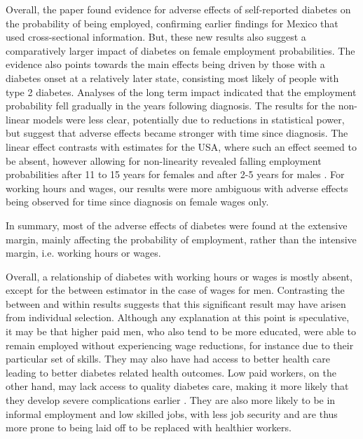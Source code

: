 \documentclass[10pt,letterpaper]{article}
\begin{document}
Overall, the paper found evidence for adverse effects of self-reported diabetes on the probability of being employed, confirming earlier findings for Mexico that used cross-sectional information. But, these new results also suggest a comparatively larger impact of diabetes on female employment probabilities. The evidence also points towards the main effects being driven by those with a diabetes onset at a relatively later state, consisting most likely of people with type 2 diabetes. Analyses of the long term impact indicated that the employment probability fell gradually in the years following diagnosis. The results for the non-linear models were less clear, potentially due to reductions in statistical power, but suggest that adverse effects became stronger with time since diagnosis. The linear effect contrasts with estimates for the USA, where such an effect seemed to be absent, however allowing for non-linearity revealed falling employment probabilities after 11 to 15 years for females and after 2-5 years for males \cite{Minor2013}. For working hours and wages, our results were more ambiguous with adverse effects being observed for time since diagnosis on female wages only.


In summary, most of the adverse effects of diabetes were found at the extensive margin, mainly affecting the probability of employment, rather than the intensive margin, i.e. working hours or wages. 

Overall, a relationship of diabetes with working hours or wages is mostly absent, except for the between estimator in the case of wages for men. Contrasting the between and within results suggests that this significant result may have arisen from individual selection. Although any explanation at this point is speculative, it may be that higher paid men, who also tend to be more educated, were able to remain employed without experiencing wage reductions, for instance due to their particular set of skills. They may also have had access to better health care leading to better diabetes related health outcomes. Low paid workers, on the other hand, may lack access to quality diabetes care, making it more likely that they develop severe complications earlier \cite{Flores-Hernandez2015}. They are also more likely to be in informal employment and low skilled jobs, with less job security and are thus more prone to being laid off to be replaced with healthier workers.
\end{document}
